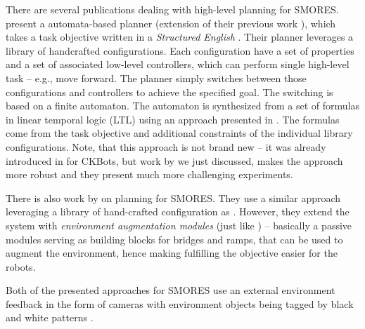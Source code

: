 There are several publications dealing with high-level planning for SMORES.
\textcite{DBLP:journals/arobots/JingTYK18} present a automata-based planner
(extension of their previous work \cite{DBLP:conf/ijcai/JingTYK17}), which takes
a task objective written in a \emph{Structured English}
\cite{DBLP:conf/iros/FinucaneJK10}. Their planner leverages a library of
handcrafted configurations. Each configuration have a set of properties and a
set of associated low-level controllers, which can perform single high-level
task -- e.g., move forward. The planner simply switches between those
configurations and controllers to achieve the specified goal. The switching is
based on a finite automaton. The automaton is synthesized from a set of formulas
in linear temporal logic (LTL) using an approach presented in
\cite{DBLP:journals/trob/Kress-GazitFP09}. The formulas come from the task
objective and additional constraints of the individual library configurations.
Note, that this approach is not brand new -- it was already introduced in
\cite{DBLP:conf/iros/CastroKK11} for CKBots, but work by
\textcite{DBLP:journals/arobots/JingTYK18} we just discussed, makes the approach
more robust and they present much more challenging experiments.

There is also work by \textcite{DBLP:conf/icra/TosunDJKCY18} on planning for
SMORES. They use a similar approach leveraging a library of hand-crafted
configuration as \cite{DBLP:journals/arobots/JingTYK18}. However, they extend
the system with \emph{environment augmentation modules} (just like
\cite{DBLP:conf/rss/PetersenNW11}) -- basically a passive modules serving as
building blocks for bridges and ramps, that can be used to augment the
environment, hence making fulfilling the objective easier for the robots.

Both of the presented approaches for SMORES use an external environment feedback
in the form of cameras with environment objects being tagged by black and white
patterns \cite{DBLP:journals/scirobotics/JingTYKC18}.

